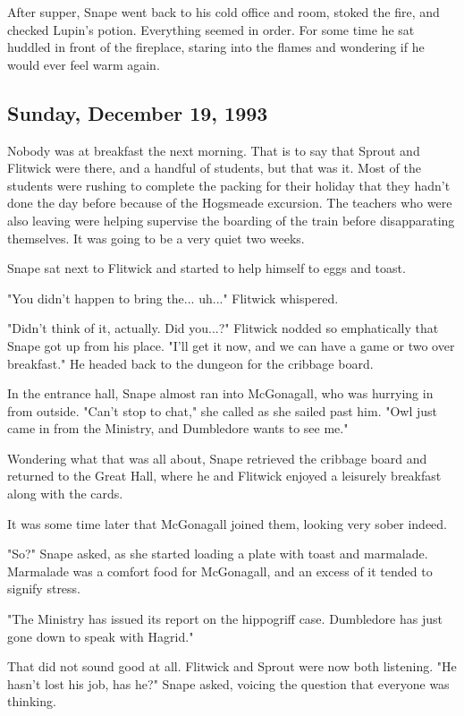After supper, Snape went back to his cold office and room, stoked the fire, and checked Lupin's potion. Everything seemed in order. For some time he sat huddled in front of the fireplace, staring into the flames and wondering if he would ever feel warm again.

\sbreak

\subsection{Sunday, December 19, 1993}

Nobody was at breakfast the next morning. That is to say that Sprout and Flitwick were there, and a handful of students, but that was it. Most of the students were rushing to complete the packing for their holiday that they hadn't done the day before because of the Hogsmeade excursion. The teachers who were also leaving were helping supervise the boarding of the train before disapparating themselves. It was going to be a very quiet two weeks.

Snape sat next to Flitwick and started to help himself to eggs and toast.

"You didn't happen to bring the... uh..." Flitwick whispered.

"Didn't think of it, actually. Did you...?" Flitwick nodded so emphatically that Snape got up from his place. "I'll get it now, and we can have a game or two over breakfast." He headed back to the dungeon for the cribbage board.

In the entrance hall, Snape almost ran into McGonagall, who was hurrying in from outside. "Can't stop to chat," she called as she sailed past him. "Owl just came in from the Ministry, and Dumbledore wants to see me."

Wondering what that was all about, Snape retrieved the cribbage board and returned to the Great Hall, where he and Flitwick enjoyed a leisurely breakfast along with the cards.

It was some time later that McGonagall joined them, looking very sober indeed.

"So?" Snape asked, as she started loading a plate with toast and marmalade. Marmalade was a comfort food for McGonagall, and an excess of it tended to signify stress.

"The Ministry has issued its report on the hippogriff case. Dumbledore has just gone down to speak with Hagrid."

That did not sound good at all. Flitwick and Sprout were now both listening. "He hasn't lost his job, has he?" Snape asked, voicing the question that everyone was thinking.

